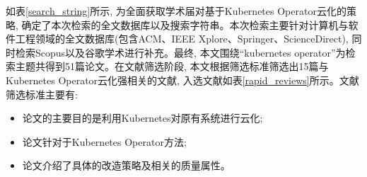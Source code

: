 如表\ref{search_string}所示, 为全面获取学术届对基于Kubernetes Operator云化的策略, 确定了本次检索的全文数据库以及搜索字符串。本次检索主要针对计算机与软件工程领域的全文数据库\cite{lisboa2010systematic}(包含ACM、IEEE Xplore、Springer、ScienceDirect), 同时检索Scopus以及谷歌学术进行补充。最终, 本文围绕“kubernetes operator”为检索主题共得到51篇论文。在文献筛选阶段, 本文根据筛选标准筛选出15篇与Kubernetes Operator云化强相关的文献, 入选文献如表\ref{rapid_reviews}所示。文献筛选标准主要有:

\begin{itemize}[itemindent=2em]
    \item 论文的主要目的是利用Kubernetes对原有系统进行云化;

    \item 论文针对于Kubernetes Operator方法;

    \item 论文介绍了具体的改造策略及相关的质量属性。
\end{itemize}

